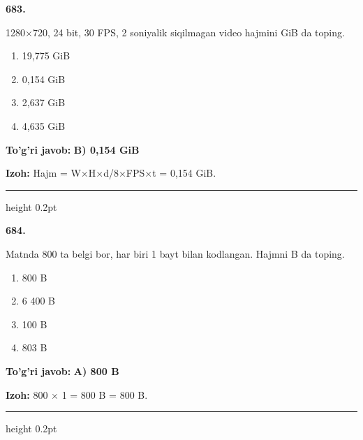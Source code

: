 \documentclass[10pt,a4paper,oneside]{article}
\begin{document}
\noindent\textbf{\color{ink}683.}
\par
1280\ensuremath{\times}720, 24 bit, 30 FPS, 2 soniyalik siqilmagan video hajmini GiB da toping.
\begin{enumerate}[label=\Alph*),leftmargin=9mm]
\item 19,775 GiB
\item 0,154 GiB
\item 2,637 GiB
\item 4,635 GiB
\end{enumerate}
\begin{tcolorbox}[enhanced,breakable,colback=teal!4,colframe=teal!50!black,boxrule=0.5pt,arc=1.1mm,left=3mm,right=3mm,top=1.7mm,bottom=1.7mm,before skip=2mm,after skip=2mm]
\textbf{\color{teal}To'g'ri javob:} \textbf{B) 0,154 GiB}
\par\smallskip
\textbf{Izoh:} Hajm = W\ensuremath{\times}H\ensuremath{\times}d/8\ensuremath{\times}FPS\ensuremath{\times}t = 0,154 GiB.
\end{tcolorbox}
\vspace{2mm}\hrule height 0.2pt \vspace{3mm}

\noindent\textbf{\color{ink}684.}
\par
Matnda 800 ta belgi bor, har biri 1 bayt bilan kodlangan. Hajmni B da toping.
\begin{enumerate}[label=\Alph*),leftmargin=9mm]
\item 800 B
\item 6 400 B
\item 100 B
\item 803 B
\end{enumerate}
\begin{tcolorbox}[enhanced,breakable,colback=teal!4,colframe=teal!50!black,boxrule=0.5pt,arc=1.1mm,left=3mm,right=3mm,top=1.7mm,bottom=1.7mm,before skip=2mm,after skip=2mm]
\textbf{\color{teal}To'g'ri javob:} \textbf{A) 800 B}
\par\smallskip
\textbf{Izoh:} 800 \ensuremath{\times} 1 = 800 B = 800 B.
\end{tcolorbox}
\vspace{2mm}\hrule height 0.2pt \vspace{3mm}
\end{document}

